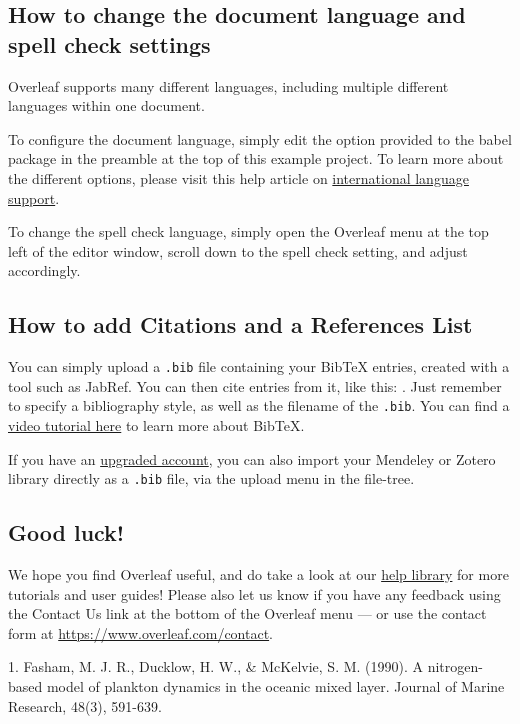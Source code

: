 \documentclass{article}
\begin{document}
\subsection{How to change the document language and spell check settings}

Overleaf supports many different languages, including multiple different languages within one document. 

To configure the document language, simply edit the option provided to the babel package in the preamble at the top of this example project. To learn more about the different options, please visit this help article on \href{https://www.overleaf.com/learn/latex/International_language_support}{international language support}.

To change the spell check language, simply open the Overleaf menu at the top left of the editor window, scroll down to the spell check setting, and adjust accordingly.

\subsection{How to add Citations and a References List}

You can simply upload a \verb|.bib| file containing your BibTeX entries, created with a tool such as JabRef. You can then cite entries from it, like this: \cite{greenwade93}. Just remember to specify a bibliography style, as well as the filename of the \verb|.bib|. You can find a \href{https://www.overleaf.com/help/97-how-to-include-a-bibliography-using-bibtex}{video tutorial here} to learn more about BibTeX.

If you have an \href{https://www.overleaf.com/user/subscription/plans}{upgraded account}, you can also import your Mendeley or Zotero library directly as a \verb|.bib| file, via the upload menu in the file-tree.

\subsection{Good luck!}

We hope you find Overleaf useful, and do take a look at our \href{https://www.overleaf.com/learn}{help library} for more tutorials and user guides! Please also let us know if you have any feedback using the Contact Us link at the bottom of the Overleaf menu --- or use the contact form at \url{https://www.overleaf.com/contact}.




1. Fasham, M. J. R., Ducklow, H. W., & McKelvie, S. M. (1990). A nitrogen-based model of plankton dynamics in the oceanic mixed layer. Journal of Marine Research, 48(3), 591-639.
\end{document}

